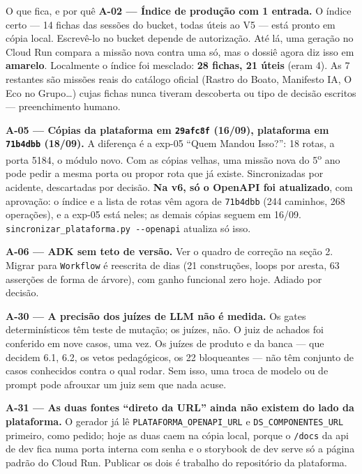 \documentclass[11pt,a4paper]{article}
\newcommand{\amarelo}{\textcolor{DarkYellow}{\textbf{amarelo}}}
\begin{document}
\begin{ressalvabox}{O que fica, e por quê}
\textbf{A-02 --- Índice de produção com 1 entrada.} O índice certo --- 14 fichas das sessões do bucket, todas úteis ao V5 --- está pronto em cópia local. Escrevê-lo no bucket depende de autorização. Até lá, uma geração no Cloud Run compara a missão nova contra uma só, mas o dossiê agora diz isso em \amarelo{}. Localmente o índice foi mesclado: \textbf{28 fichas, 21 úteis} (eram 4). As 7 restantes são missões reais do catálogo oficial (Rastro do Boato, Manifesto IA, O Eco no Grupo\ldots) cujas fichas nunca tiveram descoberta ou tipo de decisão escritos --- preenchimento humano.

\medskip
\textbf{A-05 --- Cópias da plataforma em \texttt{29afc8f} (16/09), plataforma em \texttt{71b4dbb} (18/09).} A diferença é a exp-05 ``Quem Mandou Isso?'': 18 rotas, a porta 5184, o módulo novo. Com as cópias velhas, uma missão nova do 5\textsuperscript{o} ano pode pedir a mesma porta ou propor rota que já existe. Sincronizadas por acidente, descartadas por decisão. \textbf{Na v6, só o OpenAPI foi atualizado}, com aprovação: o índice e a lista de rotas vêm agora de \texttt{71b4dbb} (244 caminhos, 268 operações), e a exp-05 está neles; as demais cópias seguem em 16/09. \texttt{sincronizar\_plataforma.py -{}-openapi} atualiza só isso.

\medskip
\textbf{A-06 --- ADK sem teto de versão.} Ver o quadro de correção na seção 2. Migrar para \texttt{Workflow} é reescrita de dias (21 construções, loops por aresta, 63 asserções de forma de árvore), com ganho funcional zero hoje. Adiado por decisão.

\medskip
\textbf{A-30 --- A precisão dos juízes de LLM não é medida.} Os gates determinísticos têm teste de mutação; os juízes, não. O juiz de achados foi conferido em nove casos, uma vez. Os juízes de produto e da banca --- que decidem 6.1, 6.2, os vetos pedagógicos, os 22 bloqueantes --- não têm conjunto de casos conhecidos contra o qual rodar. Sem isso, uma troca de modelo ou de prompt pode afrouxar um juiz sem que nada acuse.

\medskip
\textbf{A-31 --- As duas fontes ``direto da URL'' ainda não existem do lado da plataforma.} O gerador já lê \texttt{PLATAFORMA\_OPENAPI\_URL} e \texttt{DS\_COMPONENTES\_URL} primeiro, como pedido; hoje as duas caem na cópia local, porque o \texttt{/docs} da api de dev fica numa porta interna com senha e o storybook de dev serve só a página padrão do Cloud Run. Publicar os dois é trabalho do repositório da plataforma.
\end{ressalvabox}
\end{document}
